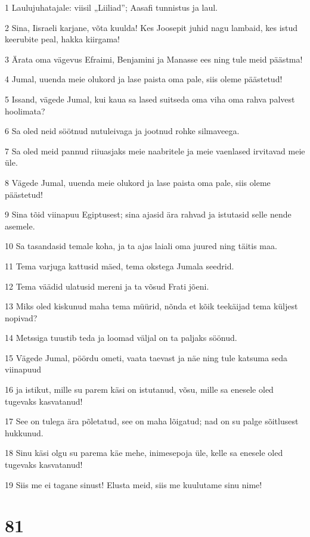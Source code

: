 \par 1 Laulujuhatajale: viisil „Liiliad”; Aasafi tunnistus ja laul.
\par 2 Sina, Iisraeli karjane, võta kuulda! Kes Joosepit juhid nagu lambaid, kes istud keerubite peal, hakka kiirgama!
\par 3 Ärata oma vägevus Efraimi, Benjamini ja Manasse ees ning tule meid päästma!
\par 4 Jumal, uuenda meie olukord ja lase paista oma pale, siis oleme päästetud!
\par 5 Issand, vägede Jumal, kui kaua sa lased suitseda oma viha oma rahva palvest hoolimata?
\par 6 Sa oled neid söötnud nutuleivaga ja jootnud rohke silmaveega.
\par 7 Sa oled meid pannud riiuasjaks meie naabritele ja meie vaenlased irvitavad meie üle.
\par 8 Vägede Jumal, uuenda meie olukord ja lase paista oma pale, siis oleme päästetud!
\par 9 Sina tõid viinapuu Egiptusest; sina ajasid ära rahvad ja istutasid selle nende asemele.
\par 10 Sa tasandasid temale koha, ja ta ajas laiali oma juured ning täitis maa.
\par 11 Tema varjuga kattusid mäed, tema okstega Jumala seedrid.
\par 12 Tema väädid ulatusid mereni ja ta võsud Frati jõeni.
\par 13 Miks oled kiskunud maha tema müürid, nõnda et kõik teekäijad tema küljest nopivad?
\par 14 Metssiga tuustib teda ja loomad väljal on ta paljaks söönud.
\par 15 Vägede Jumal, pöördu ometi, vaata taevast ja näe ning tule katsuma seda viinapuud
\par 16 ja istikut, mille su parem käsi on istutanud, võsu, mille sa enesele oled tugevaks kasvatanud!
\par 17 See on tulega ära põletatud, see on maha lõigatud; nad on su palge sõitlusest hukkunud.
\par 18 Sinu käsi olgu su parema käe mehe, inimesepoja üle, kelle sa enesele oled tugevaks kasvatanud!
\par 19 Siis me ei tagane sinust! Elusta meid, siis me kuulutame sinu nime!

\chapter{81}

